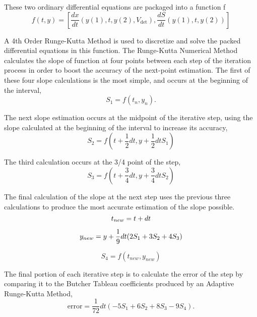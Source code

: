 \documentclass[letterpaper, twoside]{article}
\begin{document}
These two ordinary differential equations are packaged into a function f
\begin{equation} \label{eq: ODEpackagef}
  f(t,y) = \left[\frac{dx}{dt}\left(y(1), t, y(2), V_\mathrm{det}\right) , 
	      \frac{dS}{dt}\left(y(1), t, y(2)\right)\right]
\end{equation}

A 4th Order Runge-Kutta Method is used to discretize and solve the packed differential equations in this function. The Runge-Kutta Numerical Method calculates the slope of function at four points between each step of the iteration process in order to boost the accuracy of the next-point estimation. The first of these four slope calculations is the most simple, and occurs at the beginning of the interval,
\begin{equation} \label{eq: S_1}
  S_1 = f(t_n,y_n).
\end{equation}

The next slope estimation occurs at the midpoint of the iterative step, using the slope calculated at the beginning of the interval to increase its accuracy,
\begin{equation} \label{eq: S_2}
  S_2 = f(t + \frac{1}{2} dt,y + \frac{1}{2} dt S_1)
\end{equation}

The third calculation occurs at the 3/4  point of the step,
\begin{equation} \label{eq: S_3}
  S_3 = f(t + \frac{3}{4} dt,y+\frac{3}{4} dt S_2)
\end{equation}

The final calculation of the slope at the next step uses the previous three calculations to produce the most accurate estimation of the slope possible. 
\begin{equation} \label{eq: t_{new}}
  t_{new} = t + dt
\end{equation}

\begin{equation} \label{eq: y_{new}}
  y_{new} = y + \frac{1}{9} dt (2 S_1 + 3 S_2 + 4 S_3)
\end{equation}

\begin{equation} \label{eq: S_4}
  S_4 = f(t_{new},y_{new})
\end{equation}

The final portion of each iterative step is to calculate the error of the step by comparing it to the Butcher Tableau coefficients produced by an Adaptive Runge-Kutta Method,
\begin{equation} \label{eq: errorfunction}
  \mathrm{error} = \frac{1}{72} dt (-5 S_1 + 6 S_2 + 8 S_3 - 9 S_4).
\end{equation}
\end{document}
